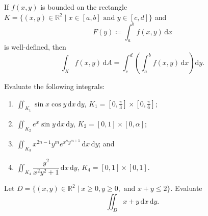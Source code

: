 \documentclass[11pt]{article}
\theoremstyle{break}
\theoremstyle{no_label}
\newcommand{\dd}{\text{d}}
\newcommand{\ddi}{\text{$\,$d}}
\newcommand{\bbR}{\mathbb{R}}
\numberwithin{equation}{theorem}
\begin{document}
\begin{theorem}
    If $f(x, y)$ is bounded on the rectangle $K=\{(x, y)\in\bbR^2\mid x\in[a, b]\text{\ and\ }y\in[c,d ]\}$ and $$F(y)\coloneq\int_a^b f(x, y)\ddi x$$ is well-defined, then $$\int_K f(x, y)\ddi A=\int_c^d\left(\int_a^b f(x, y)\ddi x\right)\dd y.$$
\end{theorem}

\begin{example}
    Evaluate the following integrals:
    \begin{enumerate}
        \item $\displaystyle\iint_{K_1}\sin x\cos y\ddi x\ddi y$, $K_1=[0, \frac{\pi}{3}]\times[0, \frac{\pi}{6}]$;
        \item $\displaystyle\iint_{K_2}e^x\sin y\ddi x\ddi y$, $K_2=[0, 1]\times[0, \alpha]$;
        \item $\displaystyle\iint_{K_3}x^{2n-1}y^me^{x^ny^{m+1}}\ddi x\ddi y$; and
        \item $\displaystyle\iint_{K_4}\dfrac{y^2}{x^2y^2+1}\ddi x\ddi y$, $K_4=[0, 1]\times[0, 1]$.
    \end{enumerate}
\end{example}
\newpage

\begin{example}
    Let $D=\{(x, y)\in\bbR^2\mid x\geq 0, y\geq 0,\text{\ and\ }x+y\leq 2\}$. Evaluate $$\iint_D x+y\ddi x\ddi y.$$
\end{example}
\end{document}
